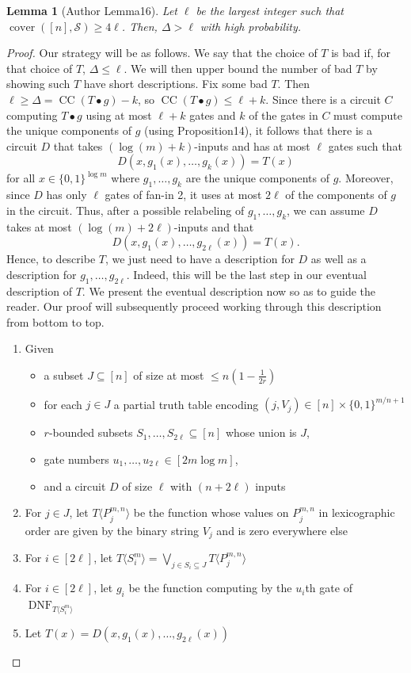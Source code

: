 \documentclass[10pt,a4paper]{article}
\newtheorem{ntlemma}[nttheorem]{Lemma}
\newcommand{\CCirc}{\operatorname{CC}}
\begin{document}
\begin{ntlemma}[Author Lemma16]
Let $\ell$ be the largest integer such that $\operatorname{cover}([n],\mathcal S)\geq4\ell$. Then, $\Delta>\ell$ with high probability.
\end{ntlemma}
\begin{proof}
Our strategy will be as follows. We say that the choice of $T$ is bad if, for that choice of $T$, $\Delta\leq\ell$. We will then upper bound the number of bad $T$ by showing such $T$ have short descriptions.
Fix some bad $T$. Then $\ell\geq\Delta=\CCirc(T\bullet g)-k$, so $\CCirc(T\bullet g)\leq\ell+k$. Since there is a circuit $C$ computing $T\bullet g$ using at most $\ell+k$ gates and $k$ of the gates in $C$ must compute the unique components of $g$ (using Proposition14), it follows that there is a circuit $D$ that takes $(\log(m)+k)$-inputs and has at most $\ell$ gates such that
\[D(x,g_1(x),\ldots,g_k(x))=T(x)\]
for all $x\in\{0,1\}^{\log m}$ where $g_1,\ldots,g_k$ are the unique components of $g$. Moreover, since $D$ has only $\ell$ gates of fan-in 2, it uses at most $2\ell$ of the components of $g$ in the circuit. Thus, after a possible relabeling of $g_1,\ldots,g_k$, we can assume $D$ takes at most $(\log(m)+2\ell)$-inputs and that
\[D(x,g_1(x),\ldots,g_{2\ell}(x))=T(x).\]
Hence, to describe $T$, we just need to have a description for $D$ as well as a description for $g_1,\ldots,g_{2\ell}$. Indeed, this will be the last step in our eventual description of $T$. We present the eventual description now so as to guide the reader. Our proof will subsequently proceed working through this description from bottom to top.
\begin{enumerate}
\item Given
\begin{itemize}
\item a subset $J\subseteq[n]$ of size at most $\leq n(1-\frac1{2r})$
\item for each $j\in J$ a partial truth table encoding $(j,V_j)\in[n]\times\{0,1\}^{m/n+1}$
\item $r$-bounded subsets $S_1,\ldots,S_{2\ell}\subseteq[n]$ whose union is $J$,
\item gate numbers $u_1,\ldots,u_{2\ell}\in[2m\log m]$,
\item and a circuit $D$ of size $\ell$ with $(n+2\ell)$ inputs
\end{itemize}
\item For $j\in J$, let $T\langle P_j^{m,n}\rangle$ be the function whose values on $P_j^{m,n}$ in lexicographic order are given by the binary string $V_j$ and is zero everywhere else
\item For $i\in[2\ell]$, let $T\langle S_i^m\rangle=\bigvee_{j\in S_i\subseteq J}T\langle P_j^{m,n}\rangle$
\item For $i\in[2\ell]$, let $g_i$ be the function computing by the $u_i$th gate of $\operatorname{DNF}_{T\langle S_i^m\rangle}$
\item Let $T(x)=D(x,g_1(x),\ldots,g_{2\ell}(x))$
\end{enumerate}

\end{proof}
\end{document}
